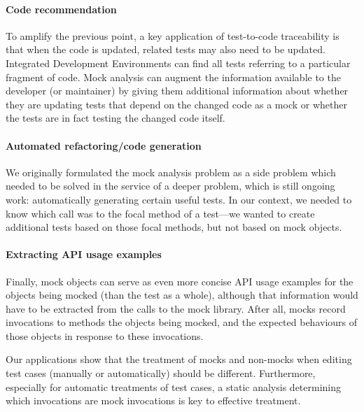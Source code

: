 \paragraph{Code recommendation}
To amplify the previous point, a key application of test-to-code
traceability is that when the code is updated, related tests may also
need to be updated. Integrated Development Environments can find
all tests referring to a particular fragment of code. Mock analysis
can augment the information available to the developer (or maintainer) by
giving them additional information about whether they are updating
tests that depend on the changed code as a mock or whether the tests
are in fact testing the changed code itself.

\paragraph{Automated refactoring/code generation}
We originally formulated the mock analysis problem as a side problem which needed
to be solved in the service of a deeper problem, which is still
ongoing work: automatically generating certain useful tests. In our context,
we needed to know which call was to the focal method of a test---we
wanted to create additional tests based on those focal methods, but
not based on mock objects.

\paragraph{Extracting API usage examples}
Finally, mock objects can serve as even more concise API usage
examples for the objects being mocked (than the test as a whole),
although that information would have to be extracted from the calls to
the mock library. After all, mocks record invocations to methods the objects
being mocked, and the expected behaviours of those objects in response to
these invocations.

Our applications show that the treatment of mocks and non-mocks
when editing test cases (manually or automatically) should be different.
Furthermore, especially for automatic treatments of test cases, a static
analysis determining which invocations are mock invocations is key to effective
treatment.

